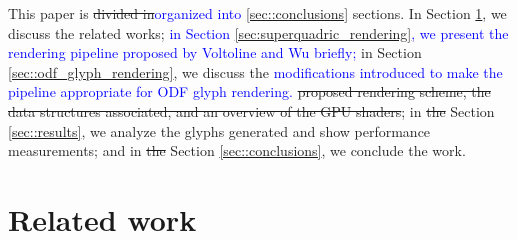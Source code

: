 \documentclass[twoside,twocolumn,10pt]{article}
\begin{document}
This paper is \sout{divided in}\textcolor{blue}{organized into} \ref{sec::conclusions} sections. In Section \ref{sec::related_work}, we discuss the related works; \textcolor{blue}{in Section \ref{sec:superquadric_rendering}, we present the rendering pipeline proposed by Voltoline and Wu briefly;} in Section \ref{sec::odf_glyph_rendering}, we discuss the \textcolor{blue}{modifications introduced to make the pipeline appropriate for ODF glyph rendering.} \sout{proposed rendering scheme, the data structures associated, and an overview of the GPU shaders}; in \sout{the} Section \ref{sec::results}, we analyze the glyphs generated and show performance measurements; and in \sout{the} Section \ref{sec::conclusions}, we conclude the work.






\section{Related work}
\label{sec::related_work}


\end{document}

